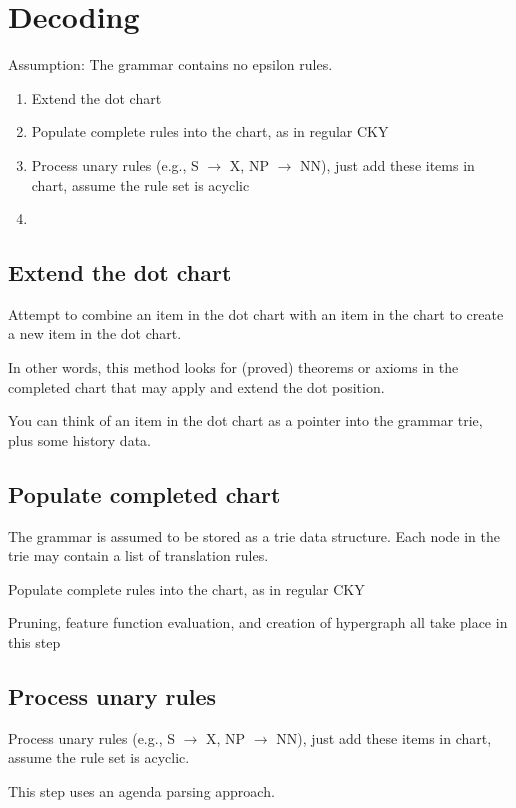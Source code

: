 \chapter{Decoding}

Assumption: The grammar contains no epsilon rules.

\begin{enumerate}
\item Extend the dot chart
\item Populate complete rules into the chart, as in regular CKY
\item Process unary rules (e.g., S $\rightarrow$ X, NP $\rightarrow$ NN), just add these items in chart, assume the rule set is acyclic
\item 
\end{enumerate}


\section{Extend the dot chart}

Attempt to combine an item in the dot chart
with an item in the chart to create a new item
in the dot chart.

In other words, this method looks 
for (proved) theorems or axioms in the completed chart
that may apply and extend the dot position.

You can think of an item in the dot chart as a pointer into the grammar trie, plus some history data.


\section{Populate completed chart}

The grammar is assumed to be stored as a trie data structure. Each node in the trie may contain a list of translation rules.

Populate complete rules into the chart, as in regular CKY

Pruning, feature function evaluation, and creation of hypergraph all take place in this step



\section{Process unary rules}

Process unary rules (e.g., S $\rightarrow$ X, NP $\rightarrow$ NN), just add these items in chart, assume the rule set is acyclic.

This step uses an agenda parsing approach.


\section{}

